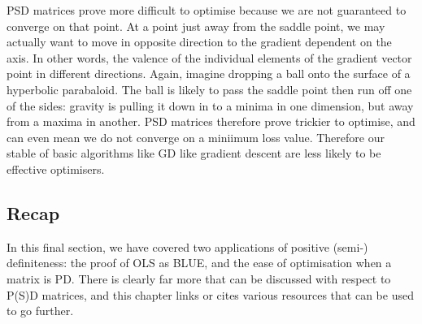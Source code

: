 \documentclass[
]{book}
\begin{document}
PSD matrices prove more difficult to optimise because we are not guaranteed to converge on that point. At a point just away from the saddle point, we may actually want to move in opposite direction to the gradient dependent on the axis. In other words, the valence of the individual elements of the gradient vector point in different directions. Again, imagine dropping a ball onto the surface of a hyperbolic parabaloid. The ball is likely to pass the saddle point then run off one of the sides: gravity is pulling it down in to a minima in one dimension, but away from a maxima in another. PSD matrices therefore prove trickier to optimise, and can even mean we do not converge on a miniimum loss value. Therefore our stable of basic algorithms like GD like gradient descent are less likely to be effective optimisers.

\hypertarget{recap}{%
\subsection{Recap}\label{recap}}

In this final section, we have covered two applications of positive (semi-) definiteness: the proof of OLS as BLUE, and the ease of optimisation when a matrix is PD. There is clearly far more that can be discussed with respect to P(S)D matrices, and this chapter links or cites various resources that can be used to go further.

  
\end{document}
